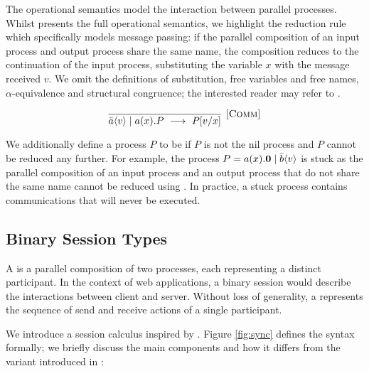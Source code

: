 The operational semantics model the interaction between parallel processes. Whilst \cite{C406Lecture} presents the full operational semantics, we highlight the  reduction rule which specifically models message passing:
if the parallel composition of an input process and output process share the same name, the composition reduces to the continuation of the input process, substituting the variable $x$ with the message received $v$. We omit the definitions of substitution, free variables and free names, $\alpha$-equivalence and structural congruence; the interested reader may refer to \cite{C406Lecture}.

$$
\infer[\mbox{\rulename{Comm}}]{\piout{a}{v} \mid \piin{a}{x}.P ~\longrightarrow ~ P[v/x] }{}
$$

We additionally define a process $P$ to be  if $P$ is not the nil process and $P$ cannot be reduced any further. For example, the process $P = a(x).\mathbf{0} \mid \bar{b}\langle v \rangle$ is stuck as the parallel composition of an input process and an output process that do not share the same name cannot be reduced using . In practice, a stuck process contains communications that will never be executed.

\subsection{Binary Session Types}
A  is a parallel composition of two processes, each representing a distinct participant.
In the context of web applications, a binary session would describe the interactions between client and server.
Without loss of generality, a  represents the sequence of send and receive actions of a single participant.

We introduce a  session calculus inspired by \cite{MPST}. Figure \ref{fig:sync} defines the syntax formally; we briefly discuss the main components and how it differs from the variant introduced in \cite{C406Lecture}:

